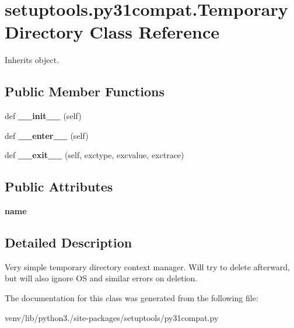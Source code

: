 \hypertarget{classsetuptools_1_1py31compat_1_1_temporary_directory}{}\section{setuptools.\+py31compat.\+Temporary\+Directory Class Reference}
\label{classsetuptools_1_1py31compat_1_1_temporary_directory}


Inherits object.

\subsection*{Public Member Functions}
\begin{DoxyCompactItemize}
\item 
\mbox{\label{classsetuptools_1_1py31compat_1_1_temporary_directory_a10803d5a31185a15db34040badf93f3c}} 
def {\bfseries \+\_\+\+\_\+init\+\_\+\+\_\+} (self)
\item 
\mbox{\label{classsetuptools_1_1py31compat_1_1_temporary_directory_aeb64cd5332da488ac52b79cf621fa716}} 
def {\bfseries \+\_\+\+\_\+enter\+\_\+\+\_\+} (self)
\item 
\mbox{\label{classsetuptools_1_1py31compat_1_1_temporary_directory_a094d803483b2edca7c397684ba97bf1e}} 
def {\bfseries \+\_\+\+\_\+exit\+\_\+\+\_\+} (self, exctype, excvalue, exctrace)
\end{DoxyCompactItemize}
\subsection*{Public Attributes}
\begin{DoxyCompactItemize}
\item 
\mbox{\label{classsetuptools_1_1py31compat_1_1_temporary_directory_a26eb31a3d0507067b022e1dc09f7c300}} 
{\bfseries name}
\end{DoxyCompactItemize}


\subsection{Detailed Description}
\begin{DoxyVerb}Very simple temporary directory context manager.
Will try to delete afterward, but will also ignore OS and similar
errors on deletion.
\end{DoxyVerb}
 

The documentation for this class was generated from the following file\+:\begin{DoxyCompactItemize}
\item 
venv/lib/python3./site-\/packages/setuptools/py31compat.\+py\end{DoxyCompactItemize}
